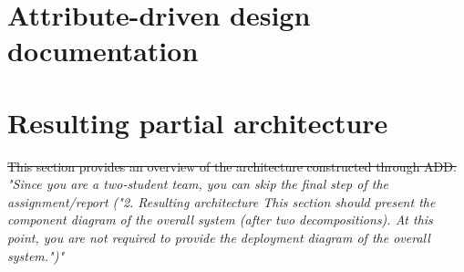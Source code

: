 \documentclass[english]{sareport}
\begin{document}
\maketitle

\tableofcontents

\chapter{Attribute-driven design documentation}\label{sec:add}

\newpage


\chapter{Resulting partial architecture}\label{sec:architecture}
\sout{This section provides an overview of the architecture constructed through ADD.}\\
\textit{"Since you are a two-student team, you can skip the final step of the
assignment/report ("2. Resulting architecture This section should present
the component diagram of the overall system (after two decompositions).
At this point, you are not required to provide the deployment diagram
of the overall system.")"}
\end{document}
